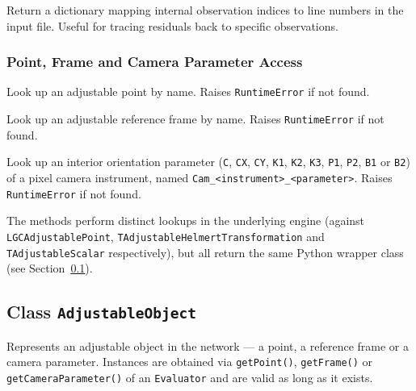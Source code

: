 \documentclass[a4paper,11pt]{article}
\newcommand{\code}[1]{\texttt{#1}}
\begin{document}
\begin{description}[style=nextline, leftmargin=1.5em]
\item[\code{getObsIndexToLineNumber() -> dict}]
    Return a dictionary mapping internal observation indices to line
    numbers in the input file. Useful for tracing residuals back to
    specific observations.
\end{description}

\subsubsection*{Point, Frame and Camera Parameter Access}

\begin{description}[style=nextline, leftmargin=1.5em]
\item[\code{getPoint(name: str) -> AdjustableObject}]
    Look up an adjustable point by name. Raises \code{RuntimeError} if
    not found.

\item[\code{getFrame(name: str) -> AdjustableObject}]
    Look up an adjustable reference frame by name. Raises
    \code{RuntimeError} if not found.

\item[\code{getCameraParameter(instrument: str, parameter: str) -> AdjustableObject}]
    Look up an interior orientation parameter (\code{C}, \code{CX},
    \code{CY}, \code{K1}, \code{K2}, \code{K3}, \code{P1}, \code{P2},
    \code{B1} or \code{B2}) of a pixel camera instrument, named
    \code{Cam\_<instrument>\_<parameter>}. Raises \code{RuntimeError} if not found.
\end{description}

The methods perform distinct lookups in the underlying engine
(against \code{LGCAdjustablePoint},
\code{TAdjustableHelmertTransformation} and \code{TAdjustableScalar}
respectively), but all return the same Python wrapper class (see
Section~\ref{sec:adjobj}).

\subsection{Class \code{AdjustableObject}}
\label{sec:adjobj}

Represents an adjustable object in the network --- a point, a
reference frame or a camera parameter. Instances are obtained via
\code{getPoint()}, \code{getFrame()} or \code{getCameraParameter()}
of an \code{Evaluator} and are valid as long as it exists.
\end{document}
